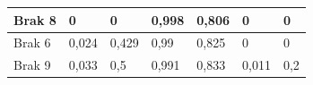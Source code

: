 \documentclass{classrep}
\begin{document}
{\begin{table}[H]
\begin{center}
\begin{tabular}{|l|l|l|l|l|l|l|}
Brak 8                                                                  & 0                                                                      & 0                                                                         & 0,998                                                         & 0,806                                                            & 0                                                                & 0                                                                   \\ \hline
Brak 6                                                                  & 0,024                                                                  & 0,429                                                                     & 0,99                                                          & 0,825                                                            & 0                                                                & 0                                                                   \\ \hline
Brak 9                                                                  & 0,033                                                                  & 0,5                                                                       & 0,991                                                         & 0,833                                                            & 0,011                                                            & 0,2                                                                 \\ \hline
\end{tabular}
\end{center}
\end{table}



}
\end{document}
